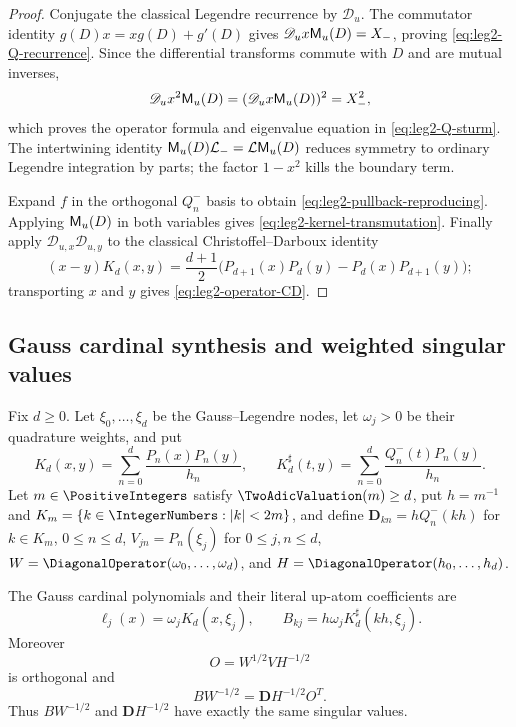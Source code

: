 \begin{proof}
Conjugate the classical Legendre recurrence by $\mathscr D_u$.  The
commutator identity $g(D)x=xg(D)+g'(D)$ gives
$\mathscr D_ux\mathsf M_u(D)=X_-$, proving
\eqref{eq:leg2-Q-recurrence}.  Since the differential transforms commute with
$D$ and are mutual inverses,
\[
 \mathscr D_ux^2\mathsf M_u(D)
 =(\mathscr D_ux\mathsf M_u(D))^2=X_-^2,
\]
which proves the operator formula and eigenvalue equation in
\eqref{eq:leg2-Q-sturm}.  The intertwining identity
$\mathsf M_u(D)\mathcal L_-=\mathcal L\mathsf M_u(D)$ reduces symmetry to ordinary
Legendre integration by parts; the factor $1-x^2$ kills the boundary term.

Expand $f$ in the orthogonal $Q_n^-$ basis to obtain
\eqref{eq:leg2-pullback-reproducing}.  Applying $\mathsf M_u(D)$ in both variables
gives \eqref{eq:leg2-kernel-transmutation}.  Finally apply
$\mathscr D_{u,x}\mathscr D_{u,y}$ to the classical
Christoffel--Darboux identity
\[
 (x-y)K_d(x,y)=\frac{d+1}{2}
 \bigl(P_{d+1}(x)P_d(y)-P_d(x)P_{d+1}(y)\bigr);
\]
transporting $x$ and $y$ gives \eqref{eq:leg2-operator-CD}.
\end{proof}

\subsection{Gauss cardinal synthesis and weighted singular values}

Fix $d\ge0$.  Let $\xi_0,\ldots,\xi_d$ be the Gauss--Legendre nodes, let
$\omega_j>0$ be their quadrature weights, and put
\begin{equation}
 K_d(x,y)=\sum_{n=0}^{d}\frac{P_n(x)P_n(y)}{h_n},
 \qquad
 K_d^\sharp(t,y)=
 \sum_{n=0}^{d}\frac{Q_n^-(t)P_n(y)}{h_n}.
 \label{eq:leg2-Gauss-kernels}
\end{equation}
Let $m\in\PositiveIntegers$ satisfy $\TwoAdicValuation(m)\ge d$, put
$h=m^{-1}$ and $K_m=\{k\in\IntegerNumbers:|k|<2m\}$, and define
$\mathbf D_{kn}=hQ_n^-(kh)$ for $k\in K_m$, $0\le n\le d$,
$V_{jn}=P_n(\xi_j)$ for $0\le j,n\le d$,
$W=\DiagonalOperator(\omega_0,\ldots,\omega_d)$, and
$H=\DiagonalOperator(h_0,\ldots,h_d)$.

\begin{theorem}
\label{thm:leg2-weighted-SVD}
The Gauss cardinal polynomials and their literal up-atom coefficients are
\begin{equation}
 \ell_j(x)=\omega_jK_d(x,\xi_j),
 \qquad
 B_{kj}=h\omega_jK_d^\sharp(kh,\xi_j).
 \label{eq:leg2-Gauss-cardinals}
\end{equation}
Moreover
\begin{equation}
 O=W^{1/2}VH^{-1/2}
 \label{eq:leg2-Gauss-orthogonal}
\end{equation}
is orthogonal and
\begin{equation}
 \boxed{BW^{-1/2}=\mathbf D H^{-1/2}O^T.}
 \label{eq:leg2-weighted-SVD}
\end{equation}
Thus $BW^{-1/2}$ and $\mathbf D H^{-1/2}$ have exactly the same singular
values.
\end{theorem}

